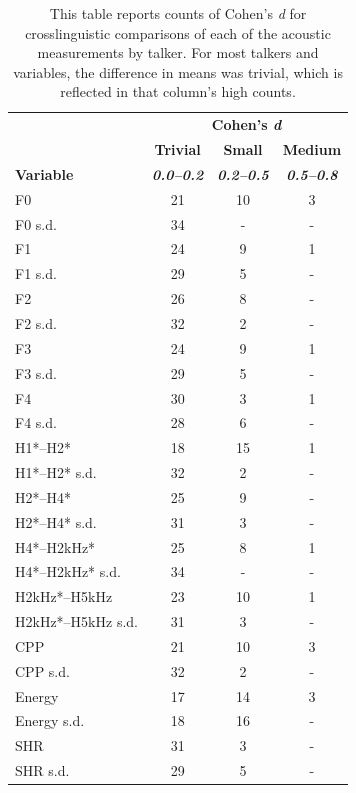 \begin{table}[htbp]
\caption{This table reports counts of Cohen's \textit{d} for crosslinguistic comparisons of each of the acoustic measurements by talker. For most talkers and variables, the difference in means was trivial, which is reflected in that column's high counts.}
\label{ch3:tab:cohend}
\centering
\begin{tabular}{lccc}
\toprule
         & \multicolumn{3}{c}{\textbf{Cohen's \textit{d}}} \\
         & \textbf{Trivial} & \textbf{Small} & \textbf{Medium} \\
\textbf{Variable} & \textbf{\textit{0.0--0.2}} & \textbf{\textit{0.2--0.5}} & \textbf{\textit{0.5--0.8}} \\ 
\midrule
F0	        &	21	&	10	&	3	\\
F0 s.d.	    &	34	&	-	&	-	\\
F1	        &	24	&	9	&	1	\\
F1 s.d.	    &	29	&	5	&	-	\\
F2	        &	26	&	8	&	-	\\
F2 s.d.	    &	32	&	2	&	-	\\
F3	        &	24	&	9	&	1	\\
F3 s.d.	    &	29	&	5	&	-	\\
F4	        &	30	&	3	&	1	\\
F4 s.d.	    &	28	&	6	&	-	\\
H1*--H2*	    &	18	&	15	&	1	\\
H1*--H2* s.d.	&	32	&	2	&	-	\\
H2*--H4*	    &	25	&	9	&	-	\\
H2*--H4* s.d.	&	31	&	3	&	-	\\
H4*--H2kHz* 	    &	25	&	8	&	1	\\
H4*--H2kHz*  s.d.	&	34	&	-	&	-	\\
H2kHz*--H5kHz	    &	23	&	10	&	1	\\
H2kHz*--H5kHz s.d.	&	31	&	3	&	-	\\
CPP	        &	21	&	10	&	3	\\
CPP s.d.	&	32	&	2	&	-	\\
Energy	    &	17	&	14	&	3	\\
Energy s.d.	&	18	&	16	&	-	\\
SHR	        &	31	&	3	&	-	\\
SHR s.d.	&	29	&	5	&	- \\
\bottomrule
\end{tabular}
\end{table}

